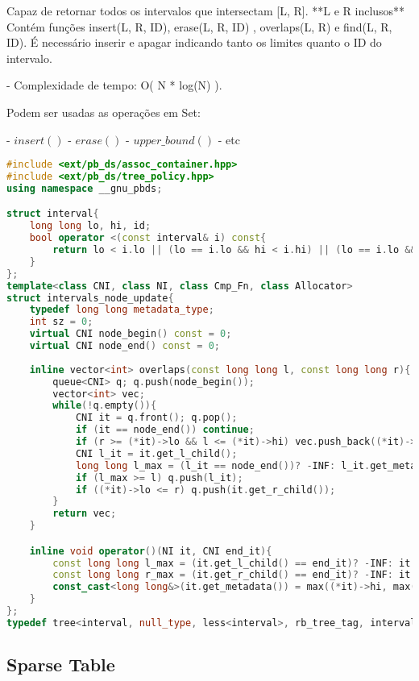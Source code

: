 \documentclass[11pt, a4paper, twoside]{article}
\begin{document}
Capaz de retornar todos os intervalos que intersectam [L, R]. **L e R inclusos**  
Contém funções insert({L, R, ID}), erase({L, R, ID}) , overlaps(L, R) e find({L, R, ID}).  
É necessário inserir e apagar indicando tanto os limites quanto o ID do intervalo.

- Complexidade de tempo: O( N * log(N) ).

Podem ser usadas as operações em Set: 

- $insert()$
- $erase()$ 
- $upper\_bound()$
- etc 

\begin{lstlisting}[language=C++]
#include <ext/pb_ds/assoc_container.hpp>
#include <ext/pb_ds/tree_policy.hpp>
using namespace __gnu_pbds;

struct interval{
    long long lo, hi, id;
    bool operator <(const interval& i) const{
        return lo < i.lo || (lo == i.lo && hi < i.hi) || (lo == i.lo && hi == i.hi && id < i.id);
    }
};
template<class CNI, class NI, class Cmp_Fn, class Allocator>
struct intervals_node_update{
    typedef long long metadata_type;
    int sz = 0;
    virtual CNI node_begin() const = 0;
    virtual CNI node_end() const = 0;
    
    inline vector<int> overlaps(const long long l, const long long r){
        queue<CNI> q; q.push(node_begin());
        vector<int> vec;
        while(!q.empty()){
            CNI it = q.front(); q.pop();
            if (it == node_end()) continue;
            if (r >= (*it)->lo && l <= (*it)->hi) vec.push_back((*it)->id);
            CNI l_it = it.get_l_child();
            long long l_max = (l_it == node_end())? -INF: l_it.get_metadata();
            if (l_max >= l) q.push(l_it);
            if ((*it)->lo <= r) q.push(it.get_r_child());    
        }
        return vec;
    }

    inline void operator()(NI it, CNI end_it){
        const long long l_max = (it.get_l_child() == end_it)? -INF: it.get_l_child().get_metadata();
        const long long r_max = (it.get_r_child() == end_it)? -INF: it.get_r_child().get_metadata();
        const_cast<long long&>(it.get_metadata()) = max((*it)->hi, max(l_max, r_max));
    }
};
typedef tree<interval, null_type, less<interval>, rb_tree_tag, intervals_node_update> interval_tree;
\end{lstlisting}

\subsection{Sparse Table}
\end{document}
